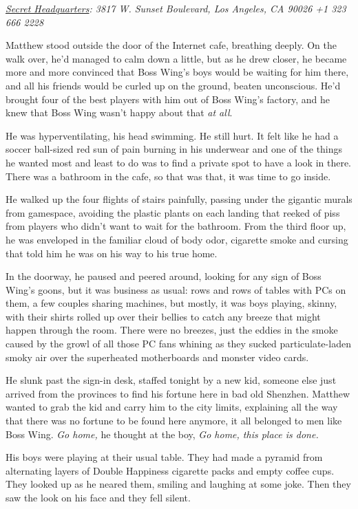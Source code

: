 \emph{\href{http://www.thesecretheadquarters.com/}{Secret Headquarters}: 3817 W. Sunset Boulevard, Los Angeles, CA 90026 +1 323 666 2228}

Matthew stood outside the door of the Internet cafe, breathing
deeply. On the walk over, he'd managed to calm down a little, but
as he drew closer, he became more and more convinced that Boss
Wing's boys would be waiting for him there, and all his friends
would be curled up on the ground, beaten unconscious. He'd brought
four of the best players with him out of Boss Wing's factory, and
he knew that Boss Wing wasn't happy about that \emph{at all}.

He was hyperventilating, his head swimming. He still hurt. It felt
like he had a soccer ball-sized red sun of pain burning in his
underwear and one of the things he wanted most and least to do was
to find a private spot to have a look in there. There was a
bathroom in the cafe, so that was that, it was time to go inside.

He walked up the four flights of stairs painfully, passing under
the gigantic murals from gamespace, avoiding the plastic plants on
each landing that reeked of piss from players who didn't want to
wait for the bathroom. From the third floor up, he was enveloped in
the familiar cloud of body odor, cigarette smoke and cursing that
told him he was on his way to his true home.

In the doorway, he paused and peered around, looking for any sign
of Boss Wing's goons, but it was business as usual: rows and rows
of tables with PCs on them, a few couples sharing machines, but
mostly, it was boys playing, skinny, with their shirts rolled up
over their bellies to catch any breeze that might happen through
the room. There were no breezes, just the eddies in the smoke
caused by the growl of all those PC fans whining as they sucked
particulate-laden smoky air over the superheated motherboards and
monster video cards.

He slunk past the sign-in desk, staffed tonight by a new kid,
someone else just arrived from the provinces to find his fortune
here in bad old Shenzhen. Matthew wanted to grab the kid and carry
him to the city limits, explaining all the way that there was no
fortune to be found here anymore, it all belonged to men like Boss
Wing. \emph{Go home,} he thought at the boy,
\emph{Go home, this place is done.}

His boys were playing at their usual table. They had made a pyramid
from alternating layers of Double Happiness cigarette packs and
empty coffee cups. They looked up as he neared them, smiling and
laughing at some joke. Then they saw the look on his face and they
fell silent.


